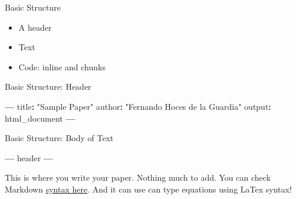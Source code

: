 \documentclass[ignorenonframetext,]{beamer}
\newenvironment{Shaded}{\begin{snugshade}}{\end{snugshade}}
\newcommand{\NormalTok}[1]{#1}
\newcommand{\OperatorTok}[1]{\textcolor[rgb]{0.81,0.36,0.00}{\textbf{#1}}}
\newcommand{\StringTok}[1]{\textcolor[rgb]{0.31,0.60,0.02}{#1}}
\providecommand{\tightlist}{%
  \setlength{\itemsep}{0pt}\setlength{\parskip}{0pt}}
\begin{document}
\begin{frame}{Basic Structure}
\protect\hypertarget{basic-structure}{}

\begin{itemize}
\tightlist
\item
  A header
\item
  Text
\item
  Code: inline and chunks
\end{itemize}

\end{frame}

\begin{frame}[fragile]{Basic Structure: Header}
\protect\hypertarget{basic-structure-header}{}

\begin{Shaded}
\begin{Highlighting}[]
\OperatorTok{---}
\NormalTok{title}\OperatorTok{:}\StringTok{ "Sample Paper"}
\NormalTok{author}\OperatorTok{:}\StringTok{ "Fernando Hoces de la Guardia"}
\NormalTok{output}\OperatorTok{:}\StringTok{ }\NormalTok{html_document}
\OperatorTok{---}
\end{Highlighting}
\end{Shaded}

\end{frame}

\begin{frame}[fragile]{Basic Structure: Body of Text}
\protect\hypertarget{basic-structure-body-of-text}{}

\begin{Shaded}
\begin{Highlighting}[]
\OperatorTok{---}
\NormalTok{header}
\OperatorTok{---}
\end{Highlighting}
\end{Shaded}

This is where you write your paper. Nothing much to add. You can check
Markdown
\href{https://www.rstudio.com/wp-content/uploads/2015/02/rmarkdown-cheatsheet.pdf}{syntax
here}. And it can use can type equations using LaTex syntax!

\end{frame}
\end{document}
